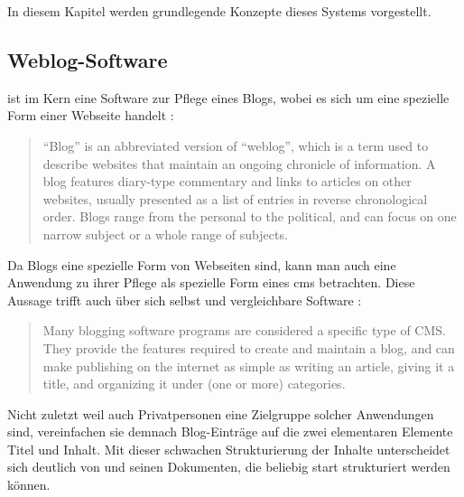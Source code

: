         In diesem Kapitel werden grundlegende Konzepte dieses Systems vorgestellt.

        \subsection{Weblog-Software}
            \label{section:weblogSoftware}
            {\wordpress} ist im Kern eine Software zur Pflege eines Blogs,
            wobei es sich um eine spezielle Form einer Webseite handelt
            \cite{wordpress:Blogging}:

            \begin{quote}
                "`Blog"' is an abbreviated version of "`weblog"',
                which is a term used to describe websites that maintain
                an ongoing chronicle of information.
                A blog features diary-type commentary and links to articles
                on other websites, usually presented as a list of entries in
                reverse chronological order.
                Blogs range from the personal to the political,
                and can focus on one narrow subject or a whole range of subjects.
            \end{quote}

            Da Blogs eine spezielle Form von Webseiten sind,
            kann man auch eine Anwendung zu ihrer Pflege als
            spezielle Form eines \gls{cms} betrachten.
            Diese Aussage trifft {\wordpress} auch über sich selbst
            und vergleichbare Software \cite{wordpress:Blogging}:

            \begin{quote}
                Many blogging software programs are considered a specific type of CMS.
                They provide the features required to create and maintain a blog,
                and can make publishing on the internet as simple as writing an article,
                giving it a title, and organizing it under (one or more) categories.
            \end{quote}

            Nicht zuletzt weil auch Privatpersonen eine Zielgruppe
            solcher Anwendungen sind, vereinfachen sie demnach Blog-Einträge
            auf die zwei elementaren Elemente Titel und Inhalt.
            Mit dieser schwachen Strukturierung der Inhalte
            unterscheidet sich {\wordpress} deutlich von {\imperia}
            und seinen Dokumenten, die beliebig start strukturiert
            werden können.

